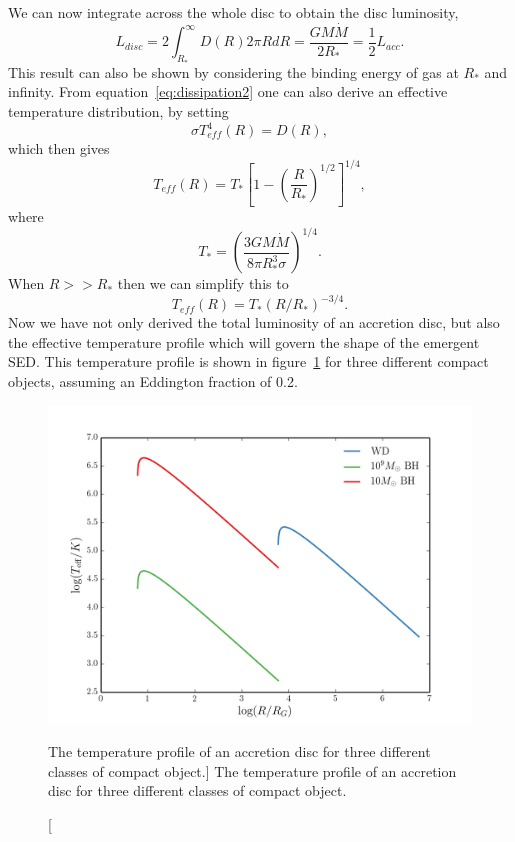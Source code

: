 We can now integrate across the whole disc to obtain the disc luminosity,
\begin{equation}
L_{disc} = 2 \int^\infty_{R_*} D(R) 2\pi R dR = \frac{G M \dot{M}}{2 R_*} = \frac{1}{2} L_{acc}.
\label{eq:ldisc}
\end{equation}
This result can also be shown by considering the binding energy of gas at $R_*$ and infinity.
From equation~\ref{eq:dissipation2} one can also derive an effective temperature distribution,
by setting
\begin{equation}
\sigma T_{eff}^4 (R) = D(R),
\end{equation}
which then gives
\begin{equation}
T_{eff} (R) = T_* \left[1 - \left( \frac{R}{R_*} \right)^{1/2} \right]^{1/4},
\label{disk_t_profile}
\end{equation}
where
\begin{equation}
T_* = \left ( \frac{3 G M \dot{M}}{8 \pi R_*^3 \sigma} \right)^{1/4}.
\end{equation}
When $R>>R_*$ then we can simplify this to
\begin{equation}
T_{eff} (R) = T_* (R / R_*)^{-3/4}.
\end{equation}
Now we have not only derived the total luminosity of an accretion disc, but
also the effective temperature profile which will govern the shape of the emergent SED.
This temperature profile is shown in figure~\ref{fig:disk_t}
for three different compact objects, assuming an Eddington fraction of 0.2.

\begin{figure}
\centering
\includegraphics[width=1.0\textwidth]{figures/01-intro/disk_t.png}
\caption
[The temperature profile of an accretion disc for three different classes
of compact object.]
{
The temperature profile of an accretion disc for three different classes
of compact object.
} 
\label{fig:disk_t}
\end{figure}

